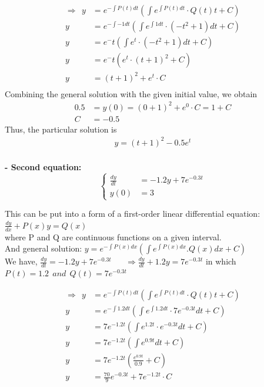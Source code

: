 \documentclass[a4paper]{article}
\numberwithin{equation}{section}
\begin{document}
\begin{align*}
  \Rightarrow ~~ y &= e^{-\int P(t)dt}(\int e^{\int P(t)dt}\cdot Q(t) t +C )\\
  y &= e^{-\int -1dt}(\int e^{\int 1dt}\cdot(-t^2+1)dt +C)\\
  y &= e^-t(\int e^t\cdot(-t^2+1)dt +C)\\
  y &= e^-t(e^t\cdot(t+1)^2 +C)\\
  y &= (t+1)^2 +e^t\cdot C\\
\end{align*}
Combining the general solution with the given initial value, we obtain
\begin{align*}
  0.5 & = y(0) = (0+1)^2 +e^0\cdot C =1+C \\
  C & = -0.5
\end{align*}
Thus, the particular solution is
\begin{align*}
   y = (t+1)^2 -0.5e^t\\
\end{align*} 

\textbf{- Second equation:}
\begin{equation*}
  \begin{cases}
    \frac{dy}{dt} & = -1.2y + 7e^{-0.3t}  \\
    y(0)          & = 3
  \end{cases}
\end{equation*}

This can be put into a form of a first-order linear differential equation: \(\frac{dy}{dx} +P(x)y  = Q(x)\)\\
where P and Q are continuous functions on a given interval.\\

And general solution: \( y = e^{-\int P(x)dx}(\int e^{\int P(x)dx}.Q(x) dx +C) \)\\

We have, $\frac{dy}{dt} = -1.2y + 7e^{-0.3t}$ ~~ $ \Rightarrow \frac{dy}{dt} +1.2y = 7e^{-0.3t}$ in which \( P(t)=1.2~~and~~Q(t)=7e^{-0.3t} \)

\begin{align*}
  \Rightarrow ~~ y &= e^{-\int P(t)dt}(\int e^{\int P(t)dt}\cdot Q(t) t +C )\\
  y &= e^{-\int 1.2dt}(\int e^{\int 1.2dt}\cdot7e^{-0.3t}dt +C)\\
  y &= 7e^{-1.2t}(\int e^{1.2t}\cdot e^{-0.3t}dt +C)\\
  y &= 7e^{-1.2t}(\int e^{0.9t}dt +C)\\
  y &= 7e^{-1.2t}(\frac{e^{0.9t}}{0.9} +C)\\
  y &= \frac{70}{9}e^{-0.3t}+7e^{-1.2t}\cdot C\\
\end{align*}
\end{document}

